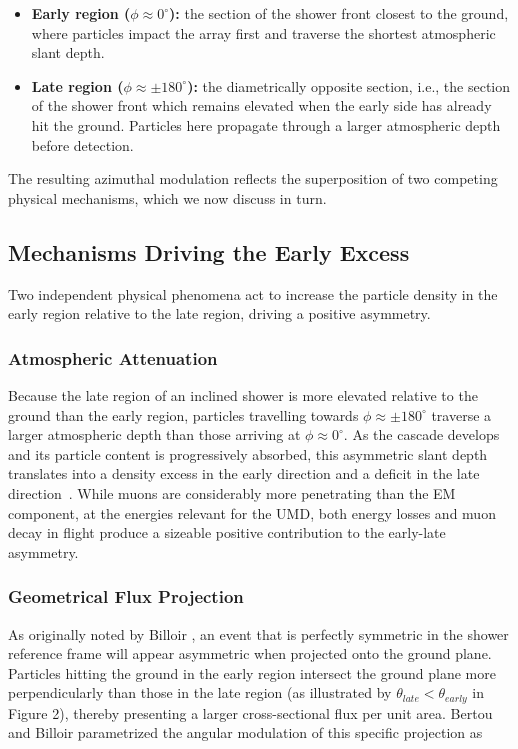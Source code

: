 \documentclass[11pt,a4paper]{article}
\begin{document}
\begin{itemize}
\item \textbf{Early region ($\phi \approx 0^{\circ}$):} the section of the shower front closest to the ground, where particles impact the array first and traverse the shortest atmospheric slant depth.
\item \textbf{Late region ($\phi \approx \pm 180^{\circ}$):} the diametrically opposite section, i.e., the section of the shower front which remains elevated when the early side has already hit the ground. Particles here propagate through a larger atmospheric depth before detection.
\end{itemize}

The resulting azimuthal modulation reflects the superposition of two competing physical mechanisms, which we now discuss in turn.

\subsection{Mechanisms Driving the Early Excess}
\label{subsec:early_excess}

Two independent physical phenomena act to increase the particle density in the early region relative to the late region, driving a positive asymmetry.

\subsubsection{Atmospheric Attenuation}

Because the late region of an inclined shower is more elevated relative to the ground than the early region, particles travelling towards $\phi \approx \pm 180^{\circ}$ traverse a larger atmospheric depth than those arriving at $\phi \approx 0^{\circ}$. As the cascade develops and its particle content is progressively absorbed, this asymmetric slant depth translates into a density excess in the early direction and a deficit in the late direction~\cite{Pryke1998,dova2003,BradfieldThesis}. While muons are considerably more penetrating than the EM component, at the energies relevant for the UMD, both energy losses and muon decay in flight produce a sizeable positive contribution to the early-late asymmetry.

\subsubsection{Geometrical Flux Projection}

As originally noted by Billoir \cite{GAP2000_017}, an event that is perfectly symmetric in the shower reference frame will appear asymmetric when projected onto the ground plane. Particles hitting the ground in the early region intersect the ground plane more perpendicularly than those in the late region (as illustrated by $\theta_{late} < \theta_{early}$ in Figure 2), thereby presenting a larger cross-sectional flux per unit area. Bertou and Billoir parametrized the angular modulation of this specific projection as 
\end{document}
